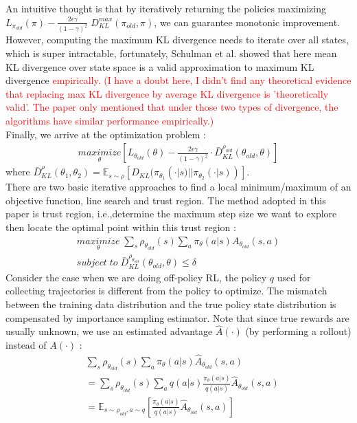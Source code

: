 \documentclass{article}
\begin{document}
An intuitive thought is that by iteratively returning the policies maximizing $L_{\pi_{old}}(\pi)-\frac{2\epsilon\gamma}{(1-\gamma)^{2}}\;D_{KL}^{max}(\pi_{old}, \pi)$, we can guarantee monotonic improvement. However, computing the maximum KL divergence needs to iterate over all states, which is super intractable, fortunately, Schulman et al. showed that here mean KL divergence over state space is a valid approximation to maximum KL divergence \textcolor{red}{empirically. (I have a doubt here, I didn't find any theoretical evidence that replacing max KL divergence by average KL divergence is 'theoretically valid'. The paper only mentioned that under those two types of divergence, the algorithms have similar performance empirically.)} \\

Finally, we arrive at the optimization problem :\begin{eqnarray}
\underset{\theta}{maximize}\left[L_{\theta_{old}}(\theta) - \frac{2\epsilon\gamma}{(1-\gamma)^{2}}\cdot\bar{D}_{KL}^{\rho_{old}}(\theta_{old}, \theta)\right]
\end{eqnarray}
where  $\bar{D}_{KL}^{\rho}(\theta_{1},\theta_{2})=\mathbb{E}_{s\sim\rho}\left[D_{KL}(\pi_{\theta_{1}}(\cdot|s)||\pi_{\theta_{2}}(\cdot|s))\right]$.\\

There are two basic iterative approaches to find a local minimum/maximum of an objective function, line search and trust region. The method adopted in this paper is trust region, i.e.,determine the maximum step size we want to explore then locate the optimal point within this trust region :\begin{eqnarray} \underset{\theta}{maximize}\; \sum_{s}\rho_{\theta_{old}}(s)\sum_{a}\pi_{\theta}(a|s)A_{\theta_{old}}(s,a)\\
 subject\;to\; \bar{D}_{KL}^{\rho_{\theta_{old}}}(\theta_{old},\theta) \leq \delta
\end{eqnarray}
Consider the case when we are doing off-policy RL, the policy $q$ used for collecting trajectories is different from the policy to optimize. The mismatch between the training data distribution and the true policy state distribution is compensated by importance sampling estimator. Note that since true rewards are usually unknown, we use an estimated advantage $\hat{A}(\cdot)$ (by performing a rollout) instead of $A(\cdot)$ :\begin{align}
 & \sum_{s}\rho_{\theta_{old}}(s)\sum_{a}\pi_{\theta}(a|s)\hat{A}_{\theta_{old}}(s,a) \\
 &= \sum_{s}\rho_{\theta_{old}}(s)\sum_{a}q(a|s)\frac{\pi_{\theta}(a|s)}{q(a|s)}\hat{A}_{\theta_{old}}(s,a)\\
 &= \mathbb{E}_{s\sim \rho_{old},a\sim q}\left[\frac{\pi_{\theta}(a|s)}{q(a|s)}\hat{A}_{\theta_{old}}(s,a)\right]
\end{align}
\end{document}
